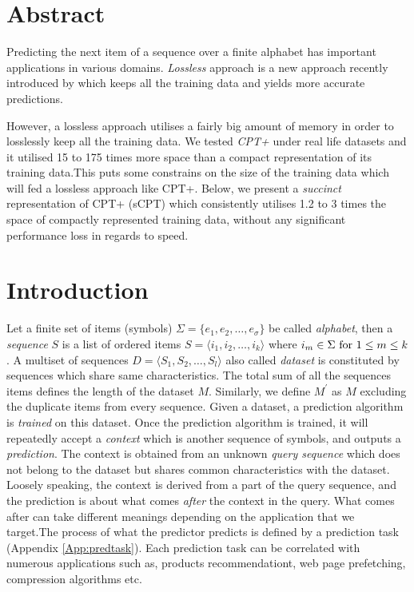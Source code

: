 \begin{comment}
							

\end{comment}

\section*{Abstract}
Predicting the next item of a sequence over a finite alphabet has important applications in various domains. \emph{Lossless} approach is a new approach  recently introduced by \citeauthor{gueniche_fournier-viger_tseng_2013} \cite{gueniche_fournier-viger_tseng_2013} which keeps all the training data and yields more accurate predictions. 
\par However, a lossless approach utilises a fairly big amount of memory in order to losslessly keep all the training data. We tested \emph{CPT+} \cite{gueniche_fournier-viger_raman_tseng_2015} under real life datasets and it utilised 15 to 175 times more space than a compact representation of its training data.This puts some constrains on the size of the training data which will fed a lossless approach like CPT+. Below, we present a \emph{succinct} representation of CPT+ (sCPT) which consistently utilises 1.2 to 3  times the space of compactly represented training data, without any significant performance loss in regards to speed.


\section{Introduction}
Let a finite set of items (symbols) \(\Sigma = \{e_1, e_2,\ldots,e_\sigma\}\) be called \emph{alphabet}, then a \emph{sequence} \(S\) is a list of ordered items \(S=\langle i_1,i_2,\ldots,i_k\rangle\) where \(i_m \in \Sigma\ \textnormal{for} \ 1\leq m \leq k\). A multiset of sequences \(D = \langle S_1, S_2,\ldots,S_l\rangle\) also called \emph{dataset} is constituted by sequences which share same characteristics. The total sum of all the sequences items defines the length of the dataset $M$. Similarly, we define $M^{\prime}$ as $M$ excluding the duplicate items from every sequence. Given a dataset, a prediction algorithm is \emph{trained} on this dataset.  Once the prediction algorithm is trained, it will repeatedly accept a \emph{context} which is another sequence of symbols, and outputs a \emph{prediction}. The context is obtained from an unknown \emph{query sequence} which does not belong to the dataset but shares common characteristics with the dataset.  Loosely speaking, the context is derived from a part of the query sequence, and the prediction is about what comes \emph{after} the context in the query. What comes after can take different meanings depending on the application that we target.The process of what the predictor predicts is defined by a prediction task (Appendix \ref{App:predtask}). Each prediction task can be correlated with numerous applications such as, products recommendationt, web page prefetching, compression algorithms etc. 

